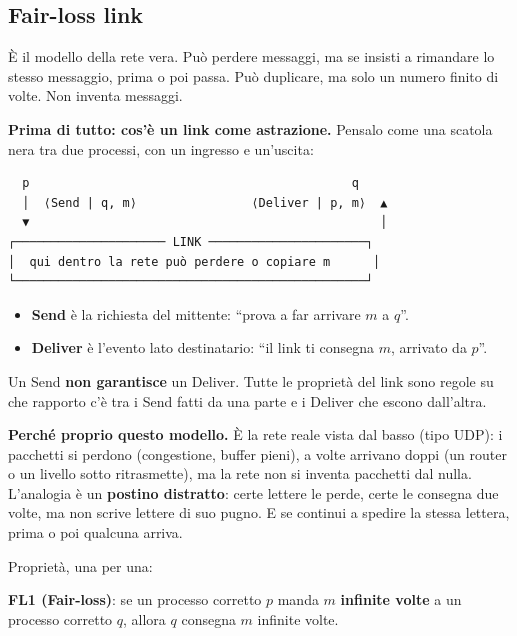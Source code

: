 \subsection{Fair-loss link}

\begin{inbreve}

È il modello della rete vera. Può perdere messaggi, ma se insisti a rimandare lo stesso messaggio, prima o poi passa. Può duplicare, ma solo un numero finito di volte. Non inventa messaggi.

\end{inbreve}

\textbf{Prima di tutto: cos'è un link come astrazione.} Pensalo come una scatola nera tra due processi, con un ingresso e un'uscita:

\begin{verbatim}
  p                                             q
  │  ⟨Send | q, m⟩                ⟨Deliver | p, m⟩  ▲
  ▼                                                 │
┌───────────────────── LINK ──────────────────────┐
│  qui dentro la rete può perdere o copiare m      │
└─────────────────────────────────────────────────┘
\end{verbatim}

\begin{itemize}
\tightlist
\item
  \textbf{Send} è la richiesta del mittente: ``prova a far arrivare \(m\) a \(q\)''.
\item
  \textbf{Deliver} è l'evento lato destinatario: ``il link ti consegna \(m\), arrivato da \(p\)''.
\end{itemize}

Un Send \textbf{non garantisce} un Deliver. Tutte le proprietà del link sono regole su che rapporto c'è tra i Send fatti da una parte e i Deliver che escono dall'altra.

\textbf{Perché proprio questo modello.} È la rete reale vista dal basso (tipo UDP): i pacchetti si perdono (congestione, buffer pieni), a volte arrivano doppi (un router o un livello sotto ritrasmette), ma la rete non si inventa pacchetti dal nulla. L'analogia è un \textbf{postino distratto}: certe lettere le perde, certe le consegna due volte, ma non scrive lettere di suo pugno. E se continui a spedire la stessa lettera, prima o poi qualcuna arriva.

Proprietà, una per una:

\textbf{FL1 (Fair-loss)}: se un processo corretto \(p\) manda \(m\) \textbf{infinite volte} a un processo corretto \(q\), allora \(q\) consegna \(m\) infinite volte.

